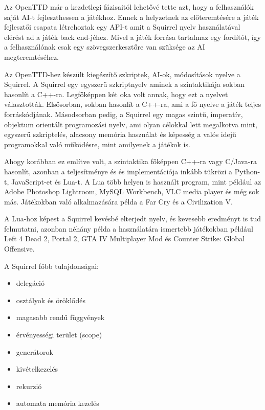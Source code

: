 
Az OpenTTD már a kezdetlegi fázisaitól lehetővé tette azt, hogy a felhasználók saját AI-t fejleszthessen a játékhoz. Ennek a helyzetnek az előteremtésére a játék fejlesztői csapata létrehoztak egy API-t amit a Squirrel nyelv használatával elérést ad a játék back end-jéhez. Mivel a játék forrása tartalmaz egy fordítót, így a felhasználónak csak egy szövegszerkesztőre van szüksége az AI megteremtéséhez.




Az OpenTTD-hez készült kiegészítő szkriptek, AI-ok, módosítások nyelve a Squirrel\cite{squirrel}. A Squirrel egy egyszerű szkriptnyelv aminek a szintaktikája sokban hasonlít a C++-ra. Legfőképpen két oka volt annak, hogy ezt a nyelvet választották. Elsősorban, sokban hasonlít a C++-ra, ami a fő nyelve a játék teljes forráskódjának. Másodsorban pedig, a Squirrel egy magas szintű,  imperatív, objektum orientált programozási nyelv, ami olyan célokkal lett megalkotva mint, egyszerű szkriptelés, alacsony memória használat és képesség a valós idejű programokkal való működésre, mint amilyenek a játékok is.

Ahogy korábban ez említve volt, a szintaktika főképpen C++-ra vagy C/Java-ra hasonlít, azonban a teljesítménye és és implementációja inkább tükrözi a Python-t, JavaScript-et és Lua-t. A Lua több helyen is használt program, mint például az Adobe Photoshop Lightroom, MySQL Workbench, VLC media player és még sok más. Játékokban való alkalmazására példa a Far Cry és a Civilization V.

A Lua-hoz képest a Squirrel kevésbé elterjedt nyelv, és kevesebb eredményt is tud felmutatni, azonban néhány példa a használatára ismertebb játékokban például Left 4 Dead 2, Portal 2, GTA IV Multiplayer Mod és Counter Strike: Global Offensive.

A Squirrel főbb tulajdonságai:

\begin{itemize}
	\item delegáció
	\item osztályok és öröklődés
	\item magasabb rendű függvények
	\item érvényességi terület (scope)
	\item generátorok
	\item kivételkezelés
	\item rekurzió
	\item automata memória kezelés
\end{itemize}

